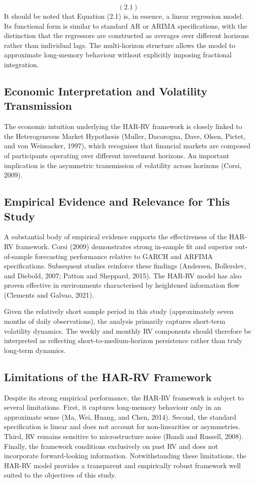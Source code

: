 \documentclass[12pt,a4paper]{report}
\begin{document}
\begin{equation}
(2.1)
\end{equation}
It should be noted that Equation (2.1) is, in essence, a linear regression model. Its functional form is similar to standard AR or ARIMA specifications, with the distinction that the regressors are constructed as averages over different horizons rather than individual lags. The multi-horizon structure allows the model to approximate long-memory behaviour without explicitly imposing fractional integration.

\subsection{Economic Interpretation and Volatility Transmission}
The economic intuition underlying the HAR-RV framework is closely linked to the Heterogeneous Market Hypothesis (Muller, Dacorogna, Dave, Olsen, Pictet, and von Weizsacker, 1997), which recognises that financial markets are composed of participants operating over different investment horizons. An important implication is the asymmetric transmission of volatility across horizons (Corsi, 2009).

\subsection{Empirical Evidence and Relevance for This Study}
A substantial body of empirical evidence supports the effectiveness of the HAR-RV framework. Corsi (2009) demonstrates strong in-sample fit and superior out-of-sample forecasting performance relative to GARCH and ARFIMA specifications. Subsequent studies reinforce these findings (Andersen, Bollerslev, and Diebold, 2007; Patton and Sheppard, 2015). The HAR-RV model has also proven effective in environments characterised by heightened information flow (Clements and Galvao, 2021).

Given the relatively short sample period in this study (approximately seven months of daily observations), the analysis primarily captures short-term volatility dynamics. The weekly and monthly RV components should therefore be interpreted as reflecting short-to-medium-horizon persistence rather than truly long-term dynamics.

\subsection{Limitations of the HAR-RV Framework}
Despite its strong empirical performance, the HAR-RV framework is subject to several limitations. First, it captures long-memory behaviour only in an approximate sense (Ma, Wei, Huang, and Chen, 2014). Second, the standard specification is linear and does not account for non-linearities or asymmetries. Third, RV remains sensitive to microstructure noise (Bandi and Russell, 2008). Finally, the framework conditions exclusively on past RV and does not incorporate forward-looking information. Notwithstanding these limitations, the HAR-RV model provides a transparent and empirically robust framework well suited to the objectives of this study.
\end{document}
